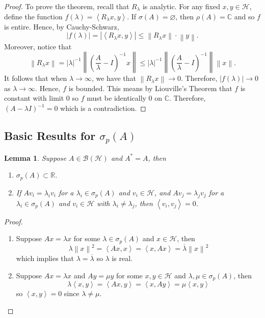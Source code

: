 \documentclass{article}
\newtheorem*{lemma}{Lemma}
\newcommand{\C}{\mathbb{C}}
\newcommand{\R}{\mathbb{R}}
\newcommand{\B}{\mathcal{B}}
\renewcommand{\H}{\mathcal{H}}
\newcommand{\inner}[2]{\left\langle#1 , #2 \right\rangle}
\newcommand{\norm}[1]{\left\lVert#1 \right\rVert}
\begin{document}
\begin{proof}
    To prove the theorem, recall that $R_{\lambda}$ is analytic. For any fixed $x,y \in \H$, define the function $f(\lambda) = \inner{R_{\lambda}x}{y}$. If $\sigma(A) = \varnothing$, then $\rho(A) = \C$ and so $f$ is entire. Hence, by Cauchy-Schwarz,
    $$|f(\lambda)| = |\inner{R_{\lambda} x}{y}| \leq \norm{R_{\lambda}x} \cdot \norm{y}.$$
    Moreover, notice that
    $$ \norm{R_{\lambda}x} = |\lambda|^{-1} \norm{\left(\frac{A}{\lambda} - I\right)^{-1} x} \leq |\lambda|^{-1} \norm{\left(\frac{A}{\lambda} - I\right)^{-1}}\norm{x}.$$
    It follows that when $\lambda \rightarrow \infty$, we have that $\norm{R_{\lambda}x} \rightarrow 0$. Therefore, $|f(\lambda)| \rightarrow 0$ as $\lambda \rightarrow \infty$. Hence, $f$ is bounded. This means by Liouville's Theorem that $f$ is constant with limit $0$ so $f$ must be identically 0 on $\C$. Therefore, $(A - \lambda I)^{-1} = 0$ which is a contradiction. 
\end{proof}

\subsection{Basic Results for $\sigma_p(A)$}

\begin{lemma}
    Suppose $A \in \B(\H)$ and $A^* = A$, then
    \begin{enumerate}[label=(\alph*)]
        \item $\sigma_p(A) \subset \R$.
        \item If $Av_i = \lambda_i v_i$ for a $\lambda_i \in \sigma_p(A)$ and $v_i \in \H$, and $Av_j = \lambda_j v_j$ for a $\lambda_i \in \sigma_p(A)$ and $v_i \in \H$ with $\lambda_i \neq \lambda_j$, then $\inner{v_i}{v_j} = 0$.
    \end{enumerate}
\end{lemma}

\begin{proof}
    \begin{enumerate}[label=(\alph*)]
        \item Suppose $Ax = \lambda x$ for some $\lambda \in \sigma_p(A)$ and $x \in \H$, then 
        $$\lambda \norm{x}^2 = \inner{Ax}{x} = \inner{x}{Ax} = \overline{\lambda}\norm{x}^2$$
        which implies that $\lambda = \overline{\lambda}$ so $\lambda$ is real.
        \item Suppose $Ax = \lambda x$ and $A y = \mu y$ for some $x,y \in \H$ and $\lambda, \mu \in \sigma_p(A)$, then
    $$\lambda \inner{x}{y} = \inner{Ax}{y} = \inner{x}{Ay}  = \mu \inner{x}{y}$$
    so $\inner{x}{y} = 0$ since $\lambda \neq \mu$. 
    \end{enumerate}
\end{proof}
\end{document}
